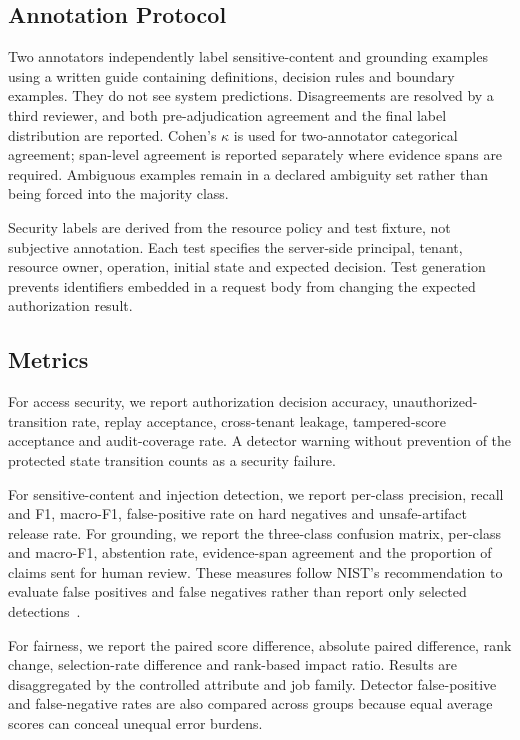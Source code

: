 \documentclass[conference]{IEEEtran}
\begin{document}
\subsection{Annotation Protocol}

Two annotators independently label sensitive-content and grounding examples using a written guide containing definitions, decision rules and boundary examples. They do not see system predictions. Disagreements are resolved by a third reviewer, and both pre-adjudication agreement and the final label distribution are reported. Cohen's $\kappa$ is used for two-annotator categorical agreement; span-level agreement is reported separately where evidence spans are required. Ambiguous examples remain in a declared ambiguity set rather than being forced into the majority class.

Security labels are derived from the resource policy and test fixture, not subjective annotation. Each test specifies the server-side principal, tenant, resource owner, operation, initial state and expected decision. Test generation prevents identifiers embedded in a request body from changing the expected authorization result.

\subsection{Metrics}

For access security, we report authorization decision accuracy, unauthorized-transition rate, replay acceptance, cross-tenant leakage, tampered-score acceptance and audit-coverage rate. A detector warning without prevention of the protected state transition counts as a security failure.

For sensitive-content and injection detection, we report per-class precision, recall and F1, macro-F1, false-positive rate on hard negatives and unsafe-artifact release rate. For grounding, we report the three-class confusion matrix, per-class and macro-F1, abstention rate, evidence-span agreement and the proportion of claims sent for human review. These measures follow NIST's recommendation to evaluate false positives and false negatives rather than report only selected detections~\cite{nist2024genai}.

For fairness, we report the paired score difference, absolute paired difference, rank change, selection-rate difference and rank-based impact ratio. Results are disaggregated by the controlled attribute and job family. Detector false-positive and false-negative rates are also compared across groups because equal average scores can conceal unequal error burdens.
\end{document}

